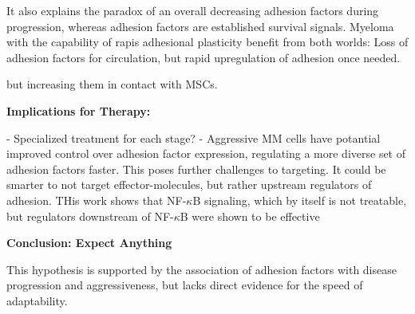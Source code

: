 It also explains the paradox of an overall decreasing adhesion factors during
progression, whereas adhesion factors are established survival signals. Myeloma
with the capability of rapis adhesional plasticity benefit from both worlds:
Loss of adhesion factors for circulation, but rapid upregulation of adhesion
once needed.

but increasing them in contact with \acp{MSC}.


\textbf{Implications for Therapy:}

- Specialized treatment for each stage?
- Aggressive MM cells have potantial improved control over adhesion factor
expression, regulating a more diverse set of adhesion factors faster. This poses
further challenges to targeting. It could be smarter to not target
effector-molecules, but rather upstream regulators of adhesion. THis work shows
that NF-$\kappa$B signaling, which by itself is not treatable, but regulators
downstream of NF-$\kappa$B were shown to be effective
\cite{adamikEZH2HDAC1Inhibition2017, adamikXRK3F2InhibitionP62ZZ2018}


\textbf{Conclusion: Expect Anything}




This hypothesis is supported by the association of adhesion
factors with disease progression and aggressiveness, but lacks direct evidence
for the speed of adaptability.














